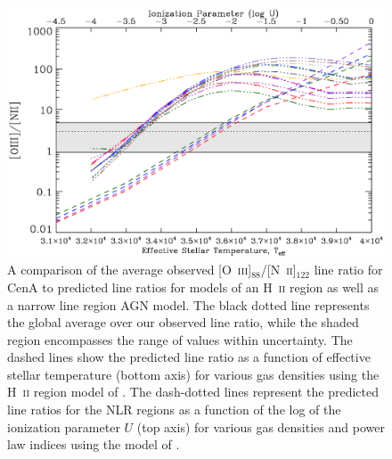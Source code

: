 \documentclass[preprint2]{aastex}
\begin{document}
\begin{figure}
\includegraphics[width=\columnwidth]{CenA_OIIIonNII_plot_v2_cropped}
\caption{A comparison of the average observed [O~\textsc{iii}]$_{88}$/[N~\textsc{ii}]$_{122}$ line ratio for CenA to predicted line ratios for models of an H~\textsc{ii} region as well as a narrow line region AGN model. The black dotted line represents the global average over our observed line ratio, while the shaded region encompasses the range of values within uncertainty.  The dashed lines show the predicted line ratio as a function of effective stellar temperature (bottom axis) for various gas densities using the H~\textsc{ii} region model of \citet{1985ApJS...57..349R}.  The dash-dotted lines represent the predicted line ratios for the NLR regions as a function of the log of the ionization parameter $U$ (top axis) for various gas densities and power law indices using the model of \citet{2004ApJS..153....9G}.}
\label{fig:OIIIonNII}
\end{figure}
\end{document}
